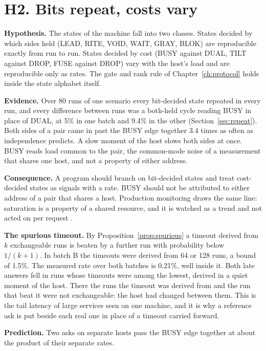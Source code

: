 \section{H2. Bits repeat, costs vary}
\label{sec:h2}

\textbf{Hypothesis.} The states of the machine fall into two classes. States decided by which
sides held (LEAD, RITE, VOID, WAIT, GRAY, BLOK) are reproducible exactly from run to run. States
decided by cost (BUSY against DUAL, TILT against DROP, FUSE against DROP) vary with the host's load
and are reproducible only as rates. The gate and rank rule of Chapter~\ref{ch:protocol} holds
inside the state alphabet itself.

\textbf{Evidence.} Over 80 runs of one scenario every bit-decided state repeated in every run,
and every difference between runs was a both-held cycle reading BUSY in place of DUAL, at 5\% in
one batch and 9.4\% in the other (Section~\ref{sec:repeat}). Both sides of a pair came in past the
BUSY edge together 3.4 times as often as independence predicts. A slow moment of the host slows
both sides at once. BUSY reads load common to the pair, the common-mode noise of a measurement
that shares one host, and not a property of either address.

\textbf{Consequence.} A program should branch on bit-decided states and treat cost-decided states
as signals with a rate. BUSY should not be attributed to either address of a pair that shares a
host. Production monitoring draws the same line: saturation is a property of a shared resource,
and it is watched as a trend and not acted on per request \cite{src:SRE}.

\textbf{The spurious timeout.} By Proposition~\ref{prop:spurious} a timeout derived from \(k\)
exchangeable runs is beaten by a further run with probability below \(1/(k+1)\). In batch B the
timeouts were derived from 64 or 128 runs, a bound of 1.5\%. The measured rate over both batches
is 0.21\%, well inside it. Both late answers fell in runs whose timeouts were among the lowest,
derived in a quiet moment of the host. There the runs the timeout was derived from and the run
that beat it were not exchangeable: the host had changed between them. This is the tail latency
of large services \cite{src:Dean-Barroso} seen on one machine, and it is why a reference ask is
put beside each real one in place of a timeout carried forward.

\textbf{Prediction.} Two asks on separate hosts pass the BUSY edge together at about the product
of their separate rates.

